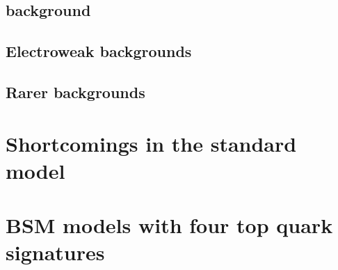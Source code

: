 \subsection{\ttbar background}

\subsection{Electroweak backgrounds}

\subsection{Rarer backgrounds}

\section{Shortcomings in the standard model}

\section{BSM models with four top quark signatures}



